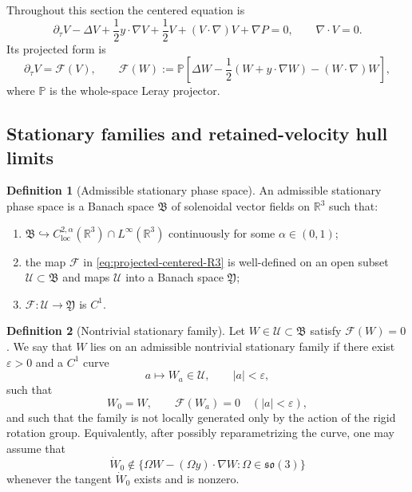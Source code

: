 \documentclass[11pt]{amsart}
\numberwithin{equation}{section}
\theoremstyle{plain}
\theoremstyle{definition}
\newtheorem{definition}[definition]{Definition}
\theoremstyle{remark}
\newcommand{\loc}{\mathrm{loc}}
\begin{document}
Throughout this section the centered equation is
\begin{equation}\label{eq:centered-R3}
   \partial_\tau V-\Delta V+\frac12 y\cdot\nabla V+\frac12 V
   +(V\cdot\nabla)V+\nabla P=0,
   \qquad \nabla\cdot V=0 .
\end{equation}
Its projected form is
\begin{equation}\label{eq:projected-centered-R3}
   \partial_\tau V=\mathcal F(V),
   \qquad
   \mathcal F(W)
   :=
   \mathbb P\left[
      \Delta W-\frac12(W+y\cdot\nabla W)-(W\cdot\nabla)W
   \right],
\end{equation}
where \(\mathbb P\) is the whole-space Leray projector.

\subsection{Stationary families and retained-velocity hull limits}

\begin{definition}[Admissible stationary phase space]
\label{def:R3-stationary-phase-space}
An admissible stationary phase space is a Banach space \(\mathfrak B\) of
solenoidal vector fields on \(\mathbb R^3\) such that:
\begin{enumerate}[label=(\roman*)]
   \item \(\mathfrak B\hookrightarrow C^{2,\alpha}_{\loc}(\mathbb R^3)
      \cap L^\infty(\mathbb R^3)\) continuously for some
      \(\alpha\in(0,1)\);
   \item the map \(\mathcal F\) in \eqref{eq:projected-centered-R3} is
      well-defined on an open subset \(\mathcal U\subset\mathfrak B\) and maps
      \(\mathcal U\) into a Banach space \(\mathfrak Y\);
   \item \(\mathcal F:\mathcal U\to\mathfrak Y\) is \(C^1\).
\end{enumerate}
\end{definition}

\begin{definition}[Nontrivial stationary family]
\label{def:R3-stationary-family}
Let \(W\in\mathcal U\subset\mathfrak B\) satisfy \(\mathcal F(W)=0\).  We say
that \(W\) lies on an admissible nontrivial stationary family if there exist
\(\varepsilon>0\) and a \(C^1\) curve
\[
   a\mapsto W_a\in\mathcal U,
   \qquad |a|<\varepsilon,
\]
such that
\begin{equation}\label{eq:R3-stationary-family}
   W_0=W,
   \qquad
   \mathcal F(W_a)=0 \quad (|a|<\varepsilon),
\end{equation}
and such that the family is not locally generated only by the action of the
rigid rotation group.  Equivalently, after possibly reparametrizing the curve,
one may assume that
\begin{equation}\label{eq:R3-nontrivial-tangent}
   \dot W_0\notin
   \{\Omega W-(\Omega y)\cdot\nabla W:\Omega\in\mathfrak{so}(3)\}
\end{equation}
whenever the tangent \(\dot W_0\) exists and is nonzero.
\end{definition}
\end{document}
